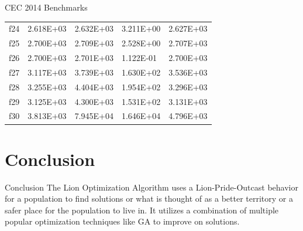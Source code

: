 \documentclass[xcolor=table]{beamer}
\begin{document}
\begin{frame}{CEC 2014 Benchmarks}
\begin{table}[]
{\begin{tabular}{lllll}
f24 & \cellcolor[HTML]{67FD9A}2.618E+03 & \cellcolor[HTML]{67FD9A}2.632E+03 & \cellcolor[HTML]{67FD9A}3.211E+00 & \cellcolor[HTML]{67FD9A}2.627E+03 \\
f25 & \cellcolor[HTML]{67FD9A}2.700E+03 & \cellcolor[HTML]{67FD9A}2.709E+03 & \cellcolor[HTML]{67FD9A}2.528E+00 & \cellcolor[HTML]{67FD9A}2.707E+03 \\
f26 & \cellcolor[HTML]{67FD9A}2.700E+03 & \cellcolor[HTML]{67FD9A}2.701E+03 & \cellcolor[HTML]{67FD9A}1.122E-01 & \cellcolor[HTML]{67FD9A}2.700E+03 \\
f27 & \cellcolor[HTML]{67FD9A}3.117E+03 & \cellcolor[HTML]{67FD9A}3.739E+03 & \cellcolor[HTML]{67FD9A}1.630E+02 & \cellcolor[HTML]{67FD9A}3.536E+03 \\
f28 & \cellcolor[HTML]{67FD9A}3.255E+03 & \cellcolor[HTML]{67FD9A}4.404E+03 & \cellcolor[HTML]{67FD9A}1.954E+02 & \cellcolor[HTML]{67FD9A}3.296E+03 \\
f29 & \cellcolor[HTML]{67FD9A}3.125E+03 & \cellcolor[HTML]{67FD9A}4.300E+03 & \cellcolor[HTML]{67FD9A}1.531E+02 & \cellcolor[HTML]{67FD9A}3.131E+03 \\
f30 & \cellcolor[HTML]{67FD9A}3.813E+03 & \cellcolor[HTML]{67FD9A}7.945E+04 & \cellcolor[HTML]{67FD9A}1.646E+04 & \cellcolor[HTML]{67FD9A}4.796E+03
\end{tabular}}
\end{table}
\end{frame}

\section{Conclusion}

\begin{frame}{Conclusion}
The Lion Optimization Algorithm uses a Lion-Pride-Outcast behavior for a population to find solutions or what is thought of as a better territory or a safer place for the population to live in. It utilizes a combination of multiple popular optimization techniques like GA to improve on solutions.
\end{frame}
\end{document}
